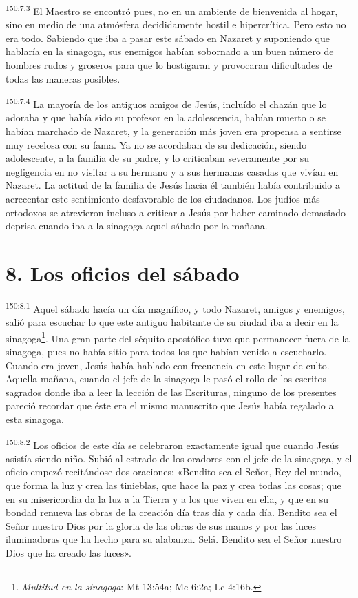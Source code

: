 \par 
\textsuperscript{150:7.3} El Maestro se encontró pues, no en un ambiente de bienvenida al hogar, sino en medio de una atmósfera decididamente hostil e hipercrítica. Pero esto no era todo. Sabiendo que iba a pasar este sábado en Nazaret y suponiendo que hablaría en la sinagoga, sus enemigos habían sobornado a un buen número de hombres rudos y groseros para que lo hostigaran y provocaran dificultades de todas las maneras posibles.

\par 
\textsuperscript{150:7.4} La mayoría de los antiguos amigos de Jesús, incluído el chazán que lo adoraba y que había sido su profesor en la adolescencia, habían muerto o se habían marchado de Nazaret, y la generación más joven era propensa a sentirse muy recelosa con su fama. Ya no se acordaban de su dedicación, siendo adolescente, a la familia de su padre, y lo criticaban severamente por su negligencia en no visitar a su hermano y a sus hermanas casadas que vivían en Nazaret. La actitud de la familia de Jesús hacia él también había contribuido a acrecentar este sentimiento desfavorable de los ciudadanos. Los judíos más ortodoxos se atrevieron incluso a criticar a Jesús por haber caminado demasiado deprisa cuando iba a la sinagoga aquel sábado por la mañana.

\section*{8. Los oficios del sábado}
\par 
\textsuperscript{150:8.1} Aquel sábado hacía un día magnífico, y todo Nazaret, amigos y enemigos, salió para escuchar lo que este antiguo habitante de su ciudad iba a decir en la sinagoga\footnote{\textit{Multitud en la sinagoga}: Mt 13:54a; Mc 6:2a; Lc 4:16b.}. Una gran parte del séquito apostólico tuvo que permanecer fuera de la sinagoga, pues no había sitio para todos los que habían venido a escucharlo. Cuando era joven, Jesús había hablado con frecuencia en este lugar de culto. Aquella mañana, cuando el jefe de la sinagoga le pasó el rollo de los escritos sagrados donde iba a leer la lección de las Escrituras, ninguno de los presentes pareció recordar que éste era el mismo manuscrito que Jesús había regalado a esta sinagoga.

\par 
\textsuperscript{150:8.2} Los oficios de este día se celebraron exactamente igual que cuando Jesús asistía siendo niño. Subió al estrado de los oradores con el jefe de la sinagoga, y el oficio empezó recitándose dos oraciones: «Bendito sea el Señor, Rey del mundo, que forma la luz y crea las tinieblas, que hace la paz y crea todas las cosas; que en su misericordia da la luz a la Tierra y a los que viven en ella, y que en su bondad renueva las obras de la creación día tras día y cada día. Bendito sea el Señor nuestro Dios por la gloria de las obras de sus manos y por las luces iluminadoras que ha hecho para su alabanza. Selá. Bendito sea el Señor nuestro Dios que ha creado las luces».


